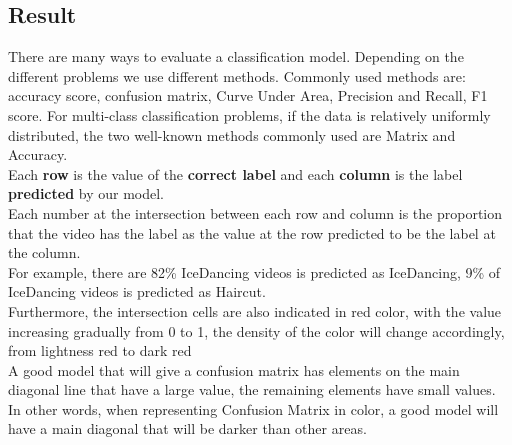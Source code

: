 \subsection{Result}
There are many ways to evaluate a classification model. Depending on the different problems we use different methods. Commonly used methods are: accuracy score, confusion matrix, Curve Under Area, Precision and Recall, F1 score. For multi-class classification problems, if the data is relatively uniformly distributed, the two well-known methods commonly used are Matrix and Accuracy.\\
Each \textbf{row} is the value of the \textbf{correct label} and each \textbf{column} is the label \textbf{predicted} by our model.\\
Each number at the intersection between each row and column is the proportion that the video has the label as the value at the row predicted to be the label at the column.\\
For example, there are 82\% IceDancing videos is predicted as IceDancing, 9\% of IceDancing videos is predicted as Haircut.\\
Furthermore, the intersection cells are also indicated in red color, with the value increasing gradually from 0 to 1, the density of the color will change accordingly, from lightness red to dark red\\
A good model that will give a confusion matrix has elements on the main diagonal line that have a large value, the remaining elements have small values. In other words, when representing Confusion Matrix in color, a good model will have a main diagonal that will be darker than other areas.



